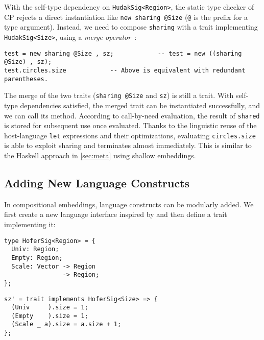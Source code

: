 With the self-type dependency on \lstinline{HudakSig<Region>}, the static type
checker of CP rejects a direct instantiation like \lstinline{new sharing @Size}
(\lstinline{@} is the prefix for a type argument). Instead, we need to compose
\lstinline{sharing} with a trait implementing \lstinline{HudakSig<Size>}, using
a \emph{merge operator}~\citep{dunfield2014elaborating}:

\begin{lstlisting}
test = new sharing @Size , sz;            -- test = new ((sharing @Size) , sz);
test.circles.size            -- Above is equivalent with redundant parentheses.
\end{lstlisting}

\noindent
The merge of the two traits (\lstinline{sharing @Size} and \lstinline{sz}) is
still a trait. With self-type dependencies satisfied, the merged trait can be
instantiated successfully, and we can call its method. According to call-by-need
evaluation, the result of \lstinline{shared} is stored for subsequent use once
evaluated. Thanks to the linguistic reuse of the host-language \lstinline{let}
expressions and their optimizations, evaluating \lstinline{circles.size} is able
to exploit sharing and terminates almost immediately. This is similar to the
Haskell approach in \autoref{sec:meta} using shallow embeddings.

\subsection{Adding New Language Constructs}\label{sec:syntax}

In compositional embeddings, language constructs can be modularly added. We
first create a new language interface inspired by \citet{hofer2008polymorphic}
and then define a trait implementing it:

\noindent
\begin{minipage}{.45\textwidth}
\begin{lstlisting}
type HoferSig<Region> = {
  Univ: Region;
  Empty: Region;
  Scale: Vector -> Region
                -> Region;
};
\end{lstlisting}
\end{minipage}%
\begin{minipage}{.55\textwidth}
\begin{lstlisting}[showlines]
sz' = trait implements HoferSig<Size> => {
  (Univ     ).size = 1;
  (Empty    ).size = 1;
  (Scale _ a).size = a.size + 1;
};
 
\end{lstlisting}
\end{minipage}

